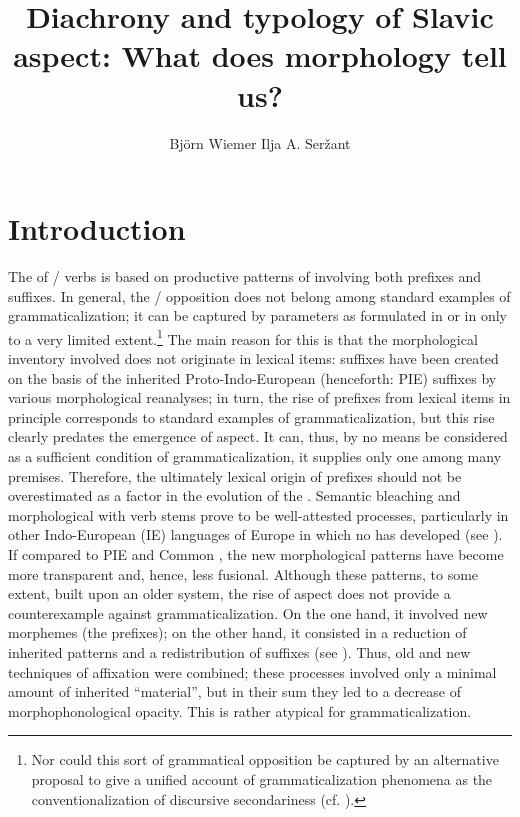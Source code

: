 \documentclass[output=paper]{langsci/langscibook}
\title{Diachrony and typology of Slavic aspect: What does morphology tell us?}
\author{%
 Björn Wiemer\affiliation{Mainz University}\lastand 
 Ilja A. Seržant\affiliation{Leipzig University}
}
\begin{document}
 
\section{Introduction}\label{sec:wiemerserzant:1}
The   of / verbs is based on productive patterns of  involving both prefixes and suffixes. In general, the  / opposition does not belong among standard examples of grammaticalization; it can be captured by parameters as formulated in \citet{Lehmann2015Thoughts} or in \citet{Heine2002} only to a very limited extent.\footnote{Nor could this sort of grammatical opposition be captured by an alternative proposal to give a unified account of grammaticalization phenomena as the conventionalization of discursive secondariness (cf. \citealt{Boye2012}).} The main reason for this is that the morphological inventory involved does not originate in lexical items: suffixes have been created on the basis of the inherited Proto-Indo-European (henceforth: PIE) suffixes by various morphological reanalyses; in turn, the rise of prefixes from lexical items in principle corresponds to standard examples of grammaticalization, but this rise clearly predates the emergence of aspect. It can, thus, by no means be considered as a sufficient condition of grammaticalization, it supplies only one among many premises. Therefore, the ultimately lexical origin of prefixes should not be overestimated as a factor in the evolution of the  . Semantic bleaching and morphological  with verb stems prove to be well-attested processes, particularly in other Indo-European (IE) languages of Europe in which no  has developed (see ). If compared to PIE and Common , the new morphological patterns have become more transparent and, hence, less fusional. Although these patterns, to some extent, built upon an older system, the rise of  aspect does not provide a counterexample against grammaticalization. On the one hand, it involved new morphemes (the prefixes); on the other hand, it consisted in a reduction of inherited patterns and a redistribution of suffixes (see ). Thus, old and new techniques of affixation were combined; these processes involved only a minimal amount of inherited “material”, but in their sum they led to a decrease of morphophonological opacity. This is rather atypical for grammaticalization.
\end{document}
